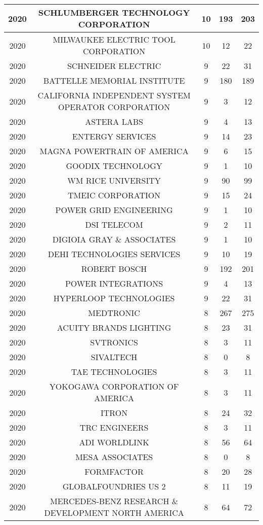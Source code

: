 \documentclass{article}%
\begin{document}
\begin{longtable}{c|c|c|c|c}
2020&SCHLUMBERGER TECHNOLOGY CORPORATION&10&193&203\\%
\hline%
2020&MILWAUKEE ELECTRIC TOOL CORPORATION&10&12&22\\%
\hline%
2020&SCHNEIDER ELECTRIC&9&22&31\\%
\hline%
2020&BATTELLE MEMORIAL INSTITUTE&9&180&189\\%
\hline%
2020&CALIFORNIA INDEPENDENT SYSTEM OPERATOR CORPORATION&9&3&12\\%
\hline%
2020&ASTERA LABS&9&4&13\\%
\hline%
2020&ENTERGY SERVICES&9&14&23\\%
\hline%
2020&MAGNA POWERTRAIN OF AMERICA&9&6&15\\%
\hline%
2020&GOODIX TECHNOLOGY&9&1&10\\%
\hline%
2020&WM RICE UNIVERSITY&9&90&99\\%
\hline%
2020&TMEIC CORPORATION&9&15&24\\%
\hline%
2020&POWER GRID ENGINEERING&9&1&10\\%
\hline%
2020&DSI TELECOM&9&2&11\\%
\hline%
2020&DIGIOIA GRAY \& ASSOCIATES&9&1&10\\%
\hline%
2020&DEHI TECHNOLOGIES SERVICES&9&10&19\\%
\hline%
2020&ROBERT BOSCH&9&192&201\\%
\hline%
2020&POWER INTEGRATIONS&9&4&13\\%
\hline%
2020&HYPERLOOP TECHNOLOGIES&9&22&31\\%
\hline%
2020&MEDTRONIC&8&267&275\\%
\hline%
2020&ACUITY BRANDS LIGHTING&8&23&31\\%
\hline%
2020&SVTRONICS&8&3&11\\%
\hline%
2020&SIVALTECH&8&0&8\\%
\hline%
2020&TAE TECHNOLOGIES&8&3&11\\%
\hline%
2020&YOKOGAWA CORPORATION OF AMERICA&8&3&11\\%
\hline%
2020&ITRON&8&24&32\\%
\hline%
2020&TRC ENGINEERS&8&3&11\\%
\hline%
2020&ADI WORLDLINK&8&56&64\\%
\hline%
2020&MESA ASSOCIATES&8&0&8\\%
\hline%
2020&FORMFACTOR&8&20&28\\%
\hline%
2020&GLOBALFOUNDRIES US 2&8&11&19\\%
\hline%
2020&MERCEDES{-}BENZ RESEARCH \& DEVELOPMENT NORTH AMERICA&8&64&72\\%

\end{longtable}
\end{document}
